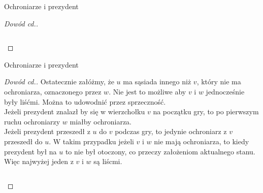 \documentclass[polish]{beamer}
\begin{document}
\begin{frame}{Ochroniarze i prezydent}
\begin{proof}[Dowód cd.]
\begin{example}
\begin{columns}
{
                    }
            \end{columns}
        \end{example}  
    \end{proof}
\end{frame}

\begin{frame}{Ochroniarze i prezydent}
    \begin{proof}[Dowód cd.]
        \renewcommand{\qedsymbol}{}
        Ostatecznie załóżmy, że $u$ ma sąsiada innego niż $v$, który nie ma ochroniarza, oznaczonego przez $w$.
        \pause
        Nie jest to możliwe aby $v$ i $w$ jednocześnie były liśćmi. Można to udowodnić przez sprzeczność.\\
        \pause
        Jeżeli prezydent znalazł by się w wierzchołku $v$ na początku gry, to po pierwszym ruchu ochroniarzy $w$ miałby ochroniarza.\\
        \pause
        Jeżeli prezydent przeszedł z $u$ do $v$ podczas gry, to jedynie ochroniarz z $v$ przeszedł do $u$.
        W takim przypadku jeżeli $v$ i $w$ nie mają ochroniarza, to kiedy prezydent był na $u$ to nie był otoczony, co przeczy założeniom aktualnego stanu.
        Więc najwyżej jeden z $v$ i $w$ są liścmi.
        \pause
        \begin{example}[anty]
            \begin{columns}
                    \centering
            \end{columns}
        \end{example}  
    \end{proof}
\end{frame}
\end{document}
